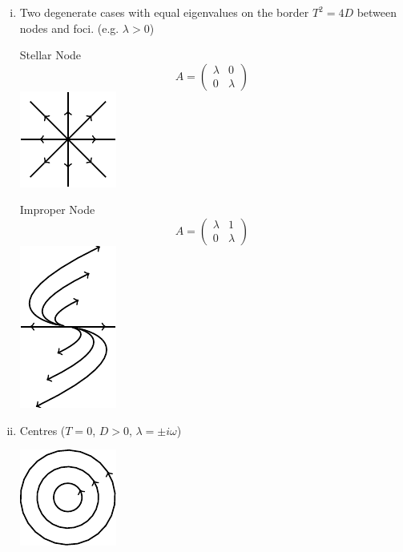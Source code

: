 \documentclass{article}
\begin{document}
\begin{enumerate}[(i)]
\item Two degenerate cases with equal eigenvalues on the border $T^2 = 4D$
between nodes and foci. (e.g. $\lambda > 0$)
\\
\begin{center}
\begin{minipage}[c][0.35\textwidth][t]{0.25\textwidth}
\begin{center}
Stellar Node 
  \[A = \left( \begin{array}{cc}
		\lambda & 0 \\
		 0 & \lambda \end{array} \right)  \]
\includegraphics{Fig10.pdf}
\end{center}
\end{minipage}
\hspace{0.1\textwidth}
\begin{minipage}[c][0.35\textwidth][t]{0.25\textwidth}
\begin{center}
Improper Node
\[  A = \left( \begin{array}{cc}
		\lambda & 1 \\
		 0 & \lambda \end{array} \right) \]
\includegraphics{Fig11.pdf}
\end{center}
\end{minipage}
\end{center}
%
\item Centres ($T=0$, $D>0$, $\lambda = \pm i \omega$)
\\
\begin{minipage}[c][0.2\textwidth][c]{0.25\textwidth}
\includegraphics{Fig12.pdf}

\end{minipage}
\end{enumerate}
\end{document}
